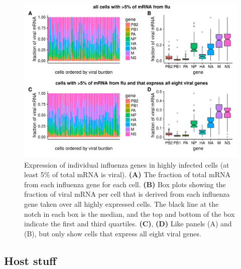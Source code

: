 \documentclass[9pt,lineno]{elife}
\begin{document}
\begin{figure}
\includegraphics[width=\linewidth]{figures/p_flu_expr.pdf}
\caption{\label{fig:fluexpr}
Expression of individual influenza genes in highly infected cells (at least 5\% of total mRNA is viral).
{\bf (A)} 
The fraction of total mRNA from each influenza gene for each cell.
{\bf (B)}
Box plots showing the fraction of viral mRNA per cell that is derived from each influenza gene taken over all highly expressed cells.
The black line at the notch in each box is the median, and the top and bottom of the box indicate the first and third quartiles.
{\bf (C)}, {\bf (D)}
Like panels (A) and (B), but only show cells that express all eight viral genes.
}
\end{figure}

\subsection{Host stuff}
\end{document}
